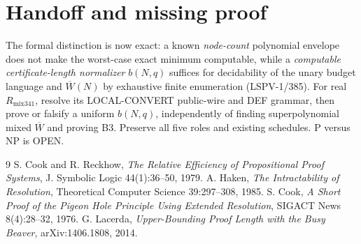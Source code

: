 \documentclass[11pt]{article}
\begin{document}
\section*{Handoff and missing proof}
The formal distinction is now exact: a known \emph{node-count} polynomial envelope does not make the worst-case exact minimum computable, while a \emph{computable certificate-length normalizer} $b(N,q)$ suffices for decidability of the unary budget language and $\overline W(N)$ by exhaustive finite enumeration (LSPV-1/385). For real $R_{\mathrm{mix341}}$, resolve its LOCAL-CONVERT public-wire and DEF grammar, then prove or falsify a uniform $b(N,q)$, independently of finding superpolynomial mixed $\overline W$ and proving B3. Preserve all five roles and existing schedules. P versus NP is OPEN.

\begin{thebibliography}{9}
 S. Cook and R. Reckhow, \emph{The Relative Efficiency of Propositional Proof Systems}, J. Symbolic Logic 44(1):36--50, 1979.
 A. Haken, \emph{The Intractability of Resolution}, Theoretical Computer Science 39:297--308, 1985.
 S. Cook, \emph{A Short Proof of the Pigeon Hole Principle Using Extended Resolution}, SIGACT News 8(4):28--32, 1976.
 G. Lacerda, \emph{Upper-Bounding Proof Length with the Busy Beaver}, arXiv:1406.1808, 2014.
\end{thebibliography}
\end{document}
